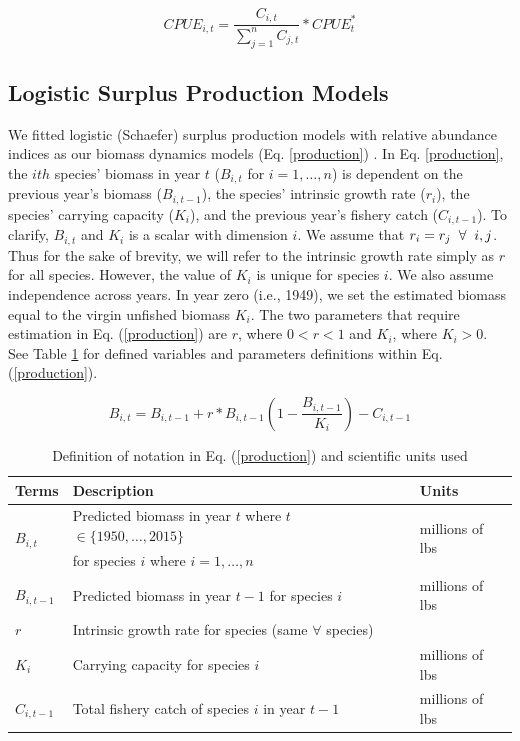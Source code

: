 \documentclass[oneside,12pt,final]{sty/ucthesis-CA2012}
\let\cite\citep                             %
\begin{document}
\begin{mainmatter}
\begin{equation} \label{proportion}
CPUE_{i,t} = \frac{C_{i,t}}{\sum_{j=1}^{n}C_{j,t}}*CPUE_t^*
\end{equation}

\subsection{Logistic Surplus Production Models}
We fitted logistic (Schaefer) surplus production models with relative abundance indices as our biomass dynamics models (Eq. \ref{production}) \cite{schaefer1954some}. In Eq. \ref{production}, the $ith$ species' biomass in year $t$ ($B_{i,t}$ for $i=1,\dots,n$) is dependent on the previous year's biomass ($B_{i,t-1}$), the species' intrinsic growth rate ($r_i$), the species' carrying capacity ($K_i$), and the previous year's fishery catch ($C_{i,t-1}$). To clarify, $B_{i,t}$ and $K_i$ is a scalar with dimension $i$. We assume that $r_i=r_j \hspace{2mm} \forall \hspace{2mm} i,j$. Thus for the sake of brevity, we will refer to the intrinsic growth rate simply as $r$ for all species. However, the value of $K_i$ is unique for species $i$. We also assume independence across years. In year zero (i.e., 1949), we set the estimated biomass equal to the virgin unfished biomass $K_i$. The two parameters that require estimation in Eq. (\ref{production}) are $r$, where $0<r<1$ and $K_i$, where $K_i > 0$. See Table \ref{production_table} for defined variables and parameters definitions within Eq. (\ref{production}).

\begin{equation} \label{production}
B_{i,t} = B_{i,t-1} + r*B_{i,t-1} \left(1- \frac{B_{i,t-1}}{K_i} \right)-C_{i,t-1} 
\end{equation}

\begin{table}[H]
\centering
\caption{Definition of notation in Eq. (\ref{production}) and scientific units used}
\begin{tabular}{l|l|l}
  \hline \small
 Terms & Description & Units  \\ 
   \hline
   \multirow{2}{*}{$B_{i,t}$} & Predicted biomass in year $t$ where $t$ $\in \{1950,\dots,2015\}$  & \multirow{2}{*}{millions of lbs} \\
     &  for species $i$ where $i=1,\dots,n$  &   \\      
   $B_{i,t-1}$ &  Predicted biomass in year $t-1$ for species $i$ & millions of lbs  \\
   $r$ & Intrinsic growth rate for species  (same $\forall$ species) & \\
   $K_i$ & Carrying capacity for species $i$ & millions of lbs  \\  
   $C_{i,t-1}$ & Total fishery catch of species $i$ in year $t-1$ & millions of lbs \\
   \hline
\end{tabular} 
\label{production_table}
\end{table}


\end{mainmatter}
\end{document}
